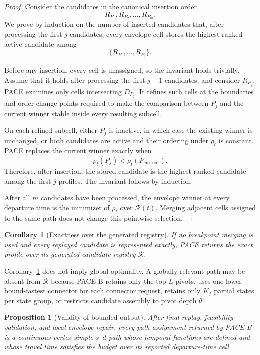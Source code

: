 \documentclass[a4paper,fleqn]{cas-dc}
\newtheorem{corollary}{Corollary}
\newtheorem{proposition}{Proposition}
\begin{document}
\begin{proof}
Consider the candidates in the canonical insertion order
\[
R_{P_1},R_{P_2},\ldots,R_{P_m}.
\]
We prove by induction on the number of inserted candidates that, after
processing the first \(j\) candidates, every envelope cell stores the
highest-ranked active candidate among
\[
\{R_{P_1},\ldots,R_{P_j}\}.
\]

Before any insertion, every cell is unassigned, so the invariant holds
trivially. Assume that it holds after processing the first \(j-1\) candidates,
and consider \(R_{P_j}\). PACE examines only cells intersecting \(D_{P_j}\).
It refines such cells at the boundaries and order-change points required to
make the comparison between \(P_j\) and the current winner stable inside every
resulting subcell.

On each refined subcell, either \(P_j\) is inactive, in which case the
existing winner is unchanged, or both candidates are active and their ordering
under \(\rho_t\) is constant. PACE replaces the current winner exactly when
\[
\rho_t(P_j)
<
\rho_t(P_{\mathrm{current}}).
\]
Therefore, after insertion, the stored candidate is the highest-ranked
candidate among the first \(j\) profiles. The invariant follows by induction.

After all \(m\) candidates have been processed, the envelope winner at every
departure time is the minimizer of \(\rho_t\) over \(\mathcal{R}(t)\).
Merging adjacent cells assigned to the same path does not change this
pointwise selection.
\end{proof}

\begin{corollary}[Exactness over the generated registry]
\label{cor:registry_exactness}
If no breakpoint merging is used and every replayed candidate is represented
exactly, PACE returns the exact profile over its generated candidate registry
\(\mathcal{R}\).
\end{corollary}

Corollary~\ref{cor:registry_exactness} does not imply global optimality.
A globally relevant path may be absent from \(\mathcal{R}\) because PACE-B
retains only the top-\(L\) pivots, uses one lower-bound-fastest connector for each connector request, retains only \(K_f\) partial states per state group, or
restricts candidate assembly to pivot depth \(\theta\).

\begin{proposition}[Validity of bounded output]
\label{prop:bounded_output_validity}
After final replay, feasibility validation, and local envelope repair, every
path assignment returned by PACE-B is a continuous vertex-simple
\(s\)--\(d\) path whose temporal functions are defined and whose travel time
satisfies the budget over its reported departure-time cell.
\end{proposition}
\end{document}
